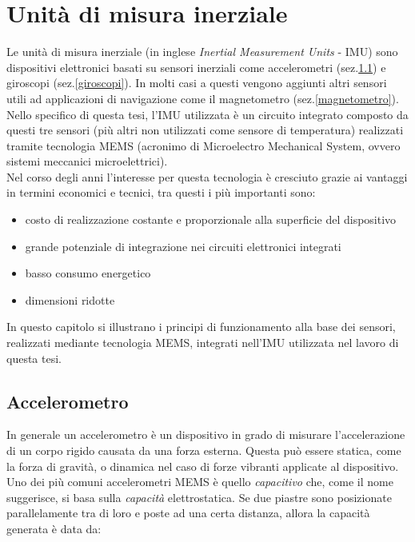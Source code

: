 \chapter{Unità di misura inerziale}
\label{tecnologie}
Le unità di misura inerziale \cite{mems} (in inglese \textit{Inertial Measurement Units} - IMU) sono dispositivi elettronici basati su sensori inerziali come accelerometri (sez.\ref{accell}) e giroscopi (sez.\ref{giroscopi}). In molti casi a questi vengono aggiunti altri sensori utili ad applicazioni di navigazione come il magnetometro (sez.\ref{magnetometro}). Nello specifico di questa tesi, l'IMU utilizzata è un circuito integrato composto da questi tre sensori (più altri non utilizzati come sensore di temperatura) realizzati tramite tecnologia MEMS (acronimo di Microelectro Mechanical System, ovvero sistemi meccanici microelettrici).\\
Nel corso degli anni l'interesse per questa tecnologia è cresciuto grazie ai vantaggi in termini economici e tecnici, tra questi i più importanti sono:
\begin{itemize}
	\item costo di realizzazione costante e proporzionale alla superficie del dispositivo
	\item grande potenziale di integrazione nei circuiti elettronici integrati
	\item basso consumo energetico
	\item dimensioni ridotte
\end{itemize}
 
 In questo capitolo si illustrano i principi di funzionamento alla base dei sensori, realizzati mediante tecnologia MEMS, integrati nell'IMU utilizzata nel lavoro di questa tesi.



\section{Accelerometro}
\label{accell}
In generale un accelerometro è un dispositivo in grado di misurare l’accelerazione di un corpo rigido causata da una forza esterna. Questa può essere statica, come la forza di gravità, o dinamica nel caso di forze vibranti applicate al dispositivo.\\
Uno dei più comuni accelerometri MEMS è quello \textit{capacitivo} che, come il nome suggerisce, si basa sulla \textit{capacità} elettrostatica. Se due piastre sono posizionate parallelamente tra di loro e poste ad una certa distanza, allora la capacità generata è data da:

